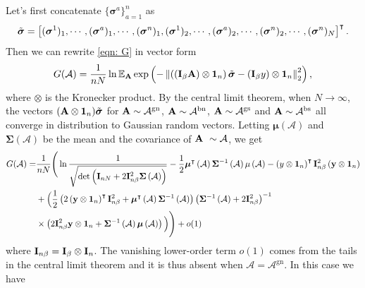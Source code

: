 \documentclass[9pt,twocolumn]{pnas-new}
\begin{document}
Let's first concatenate $\{\boldsymbol{\sigma}^a\}_{a=1}^n$ as 
\begin{equation*}
    \Tilde{\boldsymbol{\sigma}}=\left[(\boldsymbol{\sigma}^1)_1, \cdots, (\boldsymbol{\sigma}^a)_1, \cdots, (\boldsymbol{\sigma}^n)_1,  (\boldsymbol{\sigma}^1)_2, \cdots, (\boldsymbol{\sigma}^a)_2, \cdots, (\boldsymbol{\sigma}^n)_2, \cdots, (\boldsymbol{\sigma}^n)_N\right]^\intercal.
\end{equation*}
Then we can rewrite \eqref{eqn: G} in vector form
\begin{equation}\label{eqn: G 2}
    G(\mathcal{A})=\frac{1}{nN} \ln \mathbb{E}_{\mathbf{A}}\exp \left(-\left\|\left(\left(\mathbf{I}_{\beta} \mathbf{A}\right) \otimes \bm{1}_n\right) \Tilde{ \boldsymbol{\sigma}} -(\mathbf{I}_{\beta}y) \otimes\bm{1}_n\right\|_{2}^{2}\right),
\end{equation}
where $\otimes$ is the Kronecker product. By the central limit theorem, when $N\to\infty$, the vectors $(\mathbf{A} \otimes \boldsymbol{1}_n) \Tilde{\boldsymbol{\sigma}}$ for $\mathbf{A} \sim\mathcal{A}^{\text{gn}}$, $\mathbf{A} \sim \mathcal{A}^{\text{bn}}$, $\mathbf{A} \sim \mathcal{A}^{\text{gs}}$ and $\mathbf{A} \sim \mathcal{A}^{\text{bs}}$ all converge in distribution to Gaussian random vectors. Letting $\boldsymbol{\mu}(\mathcal{A})$ and $\boldsymbol{\Sigma}(\mathcal{A})$ be the mean and the covariance of $\mathbf{A}\ \sim \mathcal{A}$, we get
\begin{equation}\label{eqn: G int}
    \begin{aligned}
        G(\mathcal{A})= & \frac{1}{nN}\Bigg(\ln\frac{1}{\sqrt{\det\left(\mathbf{I}_{n N}+2\mathbf{I}_{n \beta}^{2}{\boldsymbol{\Sigma}}\left(\mathcal{A}\right)\right)}}-\frac{1}{2}\boldsymbol{\mu}^{\intercal}\left(\mathcal{A}\right){\boldsymbol{\Sigma}}^{-1}\left(\mathcal{A}\right)\mu\left(\mathcal{A}\right)-\left(y\otimes \bm{1}_n\right)^{\intercal}\mathbf{I}_{ n \beta}^{2}\left(\mathbf{y}\otimes \bm{1}_n\right)\\&+\Big(\frac{1}{2}\left(2\left(\mathbf{y}\otimes \bm{1}_n\right)^{\intercal}\mathbf{I}_{n\beta}^{2}+\boldsymbol{\mu}^{\intercal}\left(\mathcal{A}\right){\boldsymbol{\Sigma}}^{-1}\left(\mathcal{A}\right)\right)  \left({\boldsymbol{\Sigma}}^{-1}\left(\mathcal{A}\right)+2\mathbf{I}_{ n \beta}^{2}\right)^{-1}\\&\times \left(2\mathbf{I}_{ n \beta}^{2}\mathbf{y}\otimes \bm{1}_n+{\boldsymbol{\Sigma}}^{-1}\left(\mathcal{A}\right)\boldsymbol{\mu}\left(\mathcal{A}\right)\right)\Big)\Bigg)+o(1)
    \end{aligned}
\end{equation}
where $\mathbf{I}_{n\beta}=\mathbf{I}_\beta\otimes \mathbf{I}_n$. The vanishing lower-order term $o(1)$ comes from the tails in the central limit theorem and it is thus absent when $\mathcal{A}=\mathcal{A}^{\text{gn}}$. In this case we have
\end{document}
